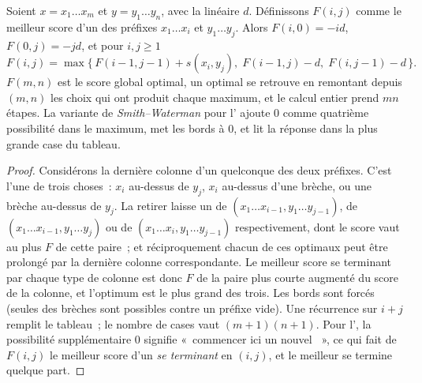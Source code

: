 \begin{theorem}\label{thm:b3:bioinformatics:nw}
Soient $x = x_{1}\dots x_{m}$ et $y = y_{1}\dots y_{n}$, avec la
 linéaire $d$. Définissons $F(i,j)$ comme le meilleur
score d'un  des préfixes $x_{1}\dots x_{i}$ et
$y_{1}\dots y_{j}$. Alors $F(i,0) = -id$, $F(0,j) = -jd$, et pour
$i,j \ge 1$
\[
F(i,j) = \max\bigl\{\,F(i-1,j-1) + s(x_{i},y_{j}),\;
F(i-1,j) - d,\; F(i,j-1) - d\,\bigr\}.
\]
$F(m,n)$ est le score global optimal, un  optimal se retrouve
en remontant depuis $(m,n)$ les choix qui ont produit chaque maximum, et
le calcul entier prend $mn$ étapes. La variante de
\emph{Smith--Waterman} pour l' ajoute $0$ comme
quatrième possibilité dans le maximum, met les bords à $0$, et lit la
réponse dans la plus grande case du tableau.
\end{theorem}
\begin{proof}
Considérons la dernière colonne d'un  quelconque des deux
préfixes. C'est l'une de trois choses~: $x_{i}$ au-dessus de $y_{j}$,
$x_{i}$ au-dessus d'une brèche, ou une brèche au-dessus de $y_{j}$. La
retirer laisse un  de $(x_{1}\dots x_{i-1},
y_{1}\dots y_{j-1})$, de $(x_{1}\dots x_{i-1}, y_{1}\dots y_{j})$ ou de
$(x_{1}\dots x_{i}, y_{1}\dots y_{j-1})$ respectivement, dont le score
vaut au plus $F$ de cette paire~; et réciproquement chacun de ces
 optimaux peut être prolongé par la dernière colonne
correspondante. Le meilleur score se terminant par chaque type de
colonne est donc $F$ de la paire plus courte augmenté du score de la
colonne, et l'optimum est le plus grand des trois. Les bords sont
forcés (seules des brèches sont possibles contre un préfixe vide). Une
récurrence sur $i + j$ remplit le tableau~; le nombre de cases vaut
$(m+1)(n+1)$. Pour l', la possibilité supplémentaire
$0$ signifie «~commencer ici un nouvel ~», ce qui fait de
$F(i,j)$ le meilleur score d'un  \emph{se terminant} en
$(i,j)$, et le meilleur  se termine quelque part.
\end{proof}

